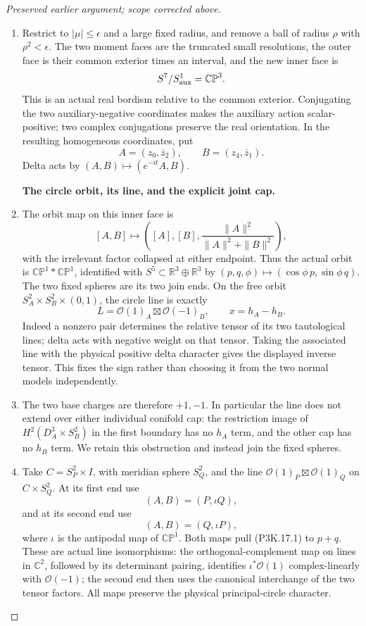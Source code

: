 \begin{proof}[Preserved earlier argument; scope corrected above]
\begin{enumerate}[label=\arabic*.]
\item Restrict to \(|\mu|\le\epsilon\) and a large fixed radius,
and remove a ball of radius \(\rho\) with \(\rho^2<\epsilon\).
The two moment faces are the truncated small resolutions, the
outer face is their common exterior times an interval, and the
new inner face is
\[
             S^7/S^1_{\rm aux}=\mathbb {CP}^3.
\]
This is an actual real bordism relative to the common exterior.
Conjugating the two auxiliary-negative coordinates makes the
auxiliary action scalar-positive; two complex conjugations
preserve the real orientation.  In the resulting homogeneous
coordinates, put
\[
       A=(z_0,\overline z_2),\qquad
       B=(z_4,\overline z_1).
\]
Delta acts by \((A,B)\mapsto(e^{-it}A,B)\).

\par\medskip\noindent\textbf{The circle orbit, its line, and the explicit joint cap.}\enspace

\item The orbit map on this inner face is
\[
 [A,B]\longmapsto
 \left([A],[B],\frac{\|A\|^2}{\|A\|^2+\|B\|^2}\right),
\]
with the irrelevant factor collapsed at either endpoint.
Thus the actual orbit is \(\mathbb {CP}^1*\mathbb {CP}^1\),
identified with \(S^5\subset\mathbb R^3\oplus\mathbb R^3\)
by \((p,q,\phi)\mapsto(\cos\phi\,p,\sin\phi\,q)\).
The two fixed spheres are its two join ends.  On the free orbit
\(S^2_A\times S^2_B\times(0,1)\), the circle line is exactly
\[
           L=\mathcal O(1)_A\boxtimes\mathcal O(-1)_B,
           \qquad x=h_A-h_B.                         \tag{P3K.17.1}
\]
Indeed a nonzero pair determines the relative tensor of its
two tautological lines; delta acts with negative weight on
that tensor.  Taking the associated line with the physical
positive delta character gives the displayed inverse tensor.
This fixes the sign rather than choosing it from the two
normal models independently.

\item The two base charges are therefore \(+1,-1\).  In particular
the line does not extend over either individual conifold cap:
the restriction image of
\(H^2(D^3_A\times S^2_B)\) in the first boundary has no
\(h_A\) term, and the other cap has no \(h_B\) term.
We retain this obstruction and instead join the fixed spheres.

\item Take \(C=S^2_P\times I\), with meridian sphere \(S^2_Q\),
and the line \(\mathcal O(1)_P\boxtimes\mathcal O(1)_Q\)
on \(C\times S^2_Q\).  At its first end use
\[
              (A,B)=(P,\iota Q),
\]
and at its second end use
\[
              (A,B)=(Q,\iota P),                    \tag{P3K.17.2}
\]
where \(\iota\) is the antipodal map of \(\mathbb {CP}^1\).
Both maps pull (P3K.17.1) to \(p+q\).  These are actual
line isomorphisms: the orthogonal-complement map on lines in
\(\mathbb C^2\), followed by its determinant pairing,
identifies \(\iota^*\mathcal O(1)\) complex-linearly with
\(\mathcal O(-1)\); the second end then uses the canonical
interchange of the two tensor factors.  All maps preserve
the physical principal-circle character.


\end{enumerate}
\end{proof}

